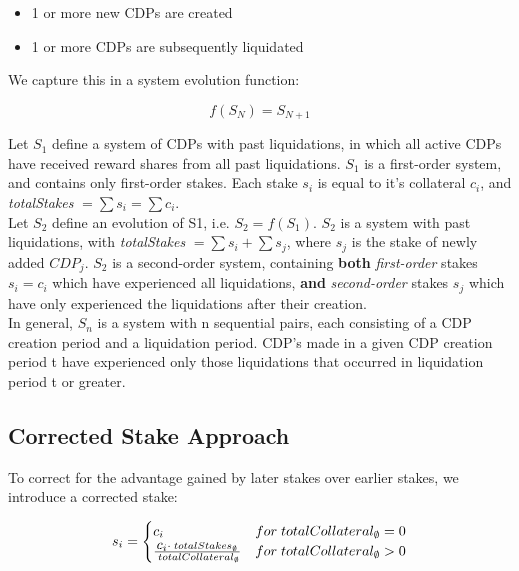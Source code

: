 \documentclass[reqno]{article}
\begin{document}
\begin{itemize}
  \item 1 or more new CDPs are created 
  \item 1 or more CDPs are subsequently liquidated
\end{itemize}

We capture this in a system evolution function:

\begin{equation} 
    f(S_N)=S_{N+1}
\end{equation}

\bigskip
Let $S_1$ define a system of CDPs with past liquidations, in which all active CDPs have received reward shares from all past liquidations. $S_1$ is a first-order system, and contains only first-order stakes. Each stake $s_i$ is equal to it’s collateral $c_i$, and \textit{totalStakes} $= \sum s_i = \sum c_i$.\\

Let $S_2$ define an evolution of S1, i.e. $S_2 = f(S_1)$. $S_2$ is a system with past liquidations, with \textit{totalStakes} $= \sum s_i + \sum s_j$, where $s_j$ is the stake of newly added $CDP_j$. $S_2$ is a second-order system, containing \textbf{both} \textit{first-order} stakes $s_i = c_i$ which have experienced all liquidations, \textbf{and} \textit{second-order} stakes $s_j$ which have only experienced the liquidations after their creation.\\

In general, $S_n$ is a system with n sequential pairs, each consisting of a CDP creation period and a liquidation period. CDP's made in a given CDP creation period t have experienced only those liquidations that occurred in liquidation period t or greater.

\bigskip
\subsection*{\textbf{Corrected Stake Approach}}

To correct for the advantage gained by later stakes over earlier stakes, we introduce a corrected stake:

\begin{equation}
    s_i=
        \begin{cases} 
            c_i & for \;totalCollateral_\emptyset = 0\\
            \frac{\mathlarger{c_i} \cdot \; totalStakes_\emptyset} {\;totalCollateral_\emptyset} & for \;totalCollateral_\emptyset>0
        \end{cases}
\end{equation}
\end{document}
